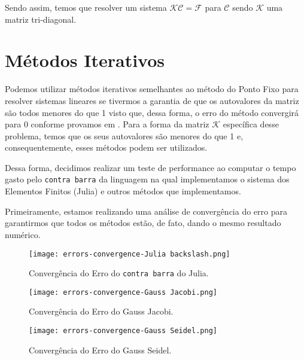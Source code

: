 Sendo assim, temos que resolver um sistema $\mathcal{K}\mathcal{C} = \mathcal{F}$ para $\mathcal{C}$ sendo $\mathcal{K}$ uma matriz tri-diagonal.


\section{Métodos Iterativos}


Podemos utilizar métodos iterativos semelhantes ao método do Ponto Fixo para resolver sistemas lineares se tivermos a garantia de que os autovalores da matriz são todos menores do que 1 visto que, dessa forma, o erro do método convergirá para $0$ conforme provamos em \cite{notas-cocada}. Para a forma da matriz $\mathcal{K}$ específica desse problema, temos que os seus autovalores são menores do que 1 e, consequentemente, esses métodos podem ser utilizados.

Dessa forma, decidimos realizar um teste de performance ao computar o tempo gasto pelo \texttt{contra barra} da linguagem na qual implementamos o sistema dos Elementos Finitos (Julia) e outros métodos que implementamos.

Primeiramente, estamos realizando uma análise de convergência do erro para garantirmos que todos os métodos estão, de fato, dando o mesmo resultado numérico.

\begin{minipage}{0.3\textwidth}
  \begin{figure}[H]
    \centering
    \texttt{[image: errors-convergence-Julia backslash.png]}
    \caption{Convergência do Erro do \texttt{contra barra} do Julia.}
  \end{figure}
\end{minipage}
\hfill
\begin{minipage}{0.3\textwidth}
  \begin{figure}[H]
    \centering
    \texttt{[image: errors-convergence-Gauss Jacobi.png]}
    \caption{Convergência do Erro do Gauss Jacobi.}
  \end{figure}
\end{minipage}
\hfill
\begin{minipage}{0.3\textwidth}
  \begin{figure}[H]
    \centering
    \texttt{[image: errors-convergence-Gauss Seidel.png]}
    \caption{Convergência do Erro do Gauss Seidel.}
  \end{figure}
\end{minipage}

